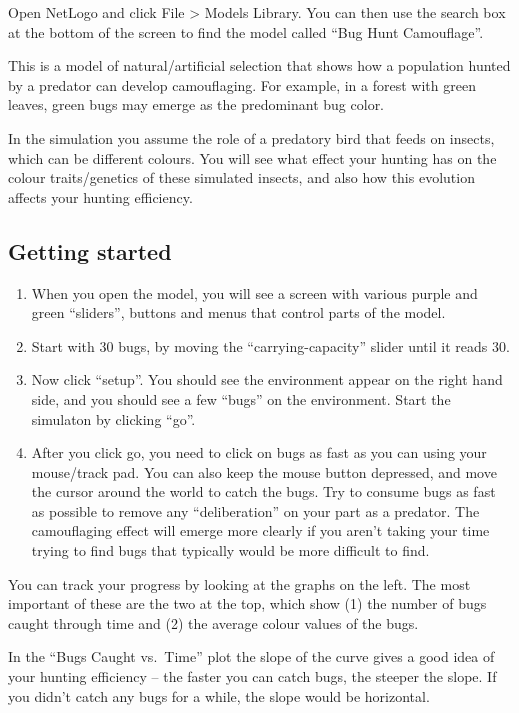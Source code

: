 \documentclass[
  a4paper]{book}
\providecommand{\tightlist}{%
  \setlength{\itemsep}{0pt}\setlength{\parskip}{0pt}}
\begin{document}
Open NetLogo and click File \textgreater{} Models Library. You can then use the search box at the bottom of the screen to find the model called ``Bug Hunt Camouflage''.

This is a model of natural/artificial selection that shows how a population hunted by a predator can develop camouflaging. For example, in a forest with green leaves, green bugs may emerge as the predominant bug color.

In the simulation you assume the role of a predatory bird that feeds on insects, which can be different colours. You will see what effect your hunting has on the colour traits/genetics of these simulated insects, and also how this evolution affects your hunting efficiency.

\hypertarget{getting-started-1}{%
\subsection{Getting started}\label{getting-started-1}}

\begin{enumerate}
\def\labelenumi{\arabic{enumi}.}
\tightlist
\item
  When you open the model, you will see a screen with various purple and green ``sliders'', buttons and menus that control parts of the model.
\item
  Start with 30 bugs, by moving the ``carrying-capacity'' slider until it reads 30.
\item
  Now click ``setup''. You should see the environment appear on the right hand side, and you should see a few ``bugs'' on the environment. Start the simulaton by clicking ``go''.
\item
  After you click go, you need to click on bugs as fast as you can using your mouse/track pad. You can also keep the mouse button depressed, and move the cursor around the world to catch the bugs. Try to consume bugs as fast as possible to remove any ``deliberation'' on your part as a predator. The camouflaging effect will emerge more clearly if you aren't taking your time trying to find bugs that typically would be more difficult to find.
\end{enumerate}

You can track your progress by looking at the graphs on the left. The most important of these are the two at the top, which show (1) the number of bugs caught through time and (2) the average colour values of the bugs.

In the ``Bugs Caught vs.~Time'' plot the slope of the curve gives a good idea of your hunting efficiency -- the faster you can catch bugs, the steeper the slope. If you didn't catch any bugs for a while, the slope would be horizontal.
\end{document}

